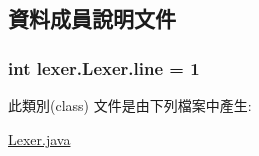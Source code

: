 \subsection{資料成員說明文件}
\subsubsection[{\texorpdfstring{line}{line}}]{\setlength{\rightskip}{0pt plus 5cm}int lexer.\+Lexer.\+line = 1}\hypertarget{classlexer_1_1_lexer_aa3f0241bd211c220367e73def9003d94}{}\label{classlexer_1_1_lexer_aa3f0241bd211c220367e73def9003d94}


此類別(class) 文件是由下列檔案中產生\+:\begin{DoxyCompactItemize}
\item 
\hyperlink{_lexer_8java}{Lexer.\+java}\end{DoxyCompactItemize}
